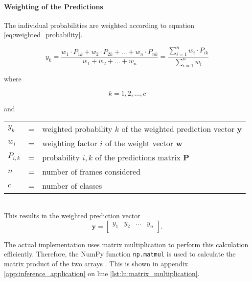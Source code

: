 \paragraph{Weighting of the Predictions} %
The individual probabilities are weighted according to equation \ref{eq:weighted_probability}.

\begin{equation}
  y_k = \frac{w_1 \cdot P_{1k} + w_2 \cdot P_{2k} + \dots + w_n \cdot P_{nk}}{w_1 + w_2 + \dots + w_n} = \frac{\sum\limits_{i=1}^{n} w_i \cdot P_{ik}}{\sum\limits_{i=1}^{n} w_i}
  \label{eq:weighted_probability}
\end{equation}

where

\[
  k = 1, 2, \dots, c
\]

and

\begin{tabular}{lll}
  $y_k$ & = & weighted probability $k$ of the weighted prediction vector $\boldsymbol{y}$ \\ %
  $w_i$ & = & weighting factor $i$ of the weight vector $\boldsymbol{w}$ \\
  $P_{i,k}$ & = & probability $i,k$ of the predictions matrix $\boldsymbol{P}$ \\
  $n$ & = & number of frames considered \\
  $c$ & = & number of classes \\
\end{tabular}
\\

This results in the weighted prediction vector
\begin{equation}
  \boldsymbol{y} =
  \begin{bmatrix}
    y_{1} & y_{2} & \dots & y_{n} \\
  \end{bmatrix}.
  \label{eq:weighted_prediction_vector}
\end{equation}

The actual implementation uses matrix multiplication to perform this calculation efficiently.
Therefore, the NumPy function \texttt{np.matmul} is used to calculate the matrix product of the two arrays \cite{}. %
This is shown in appendix \ref{app:inference_application} on line \ref{lst:ln:matrix_multiplication}.

